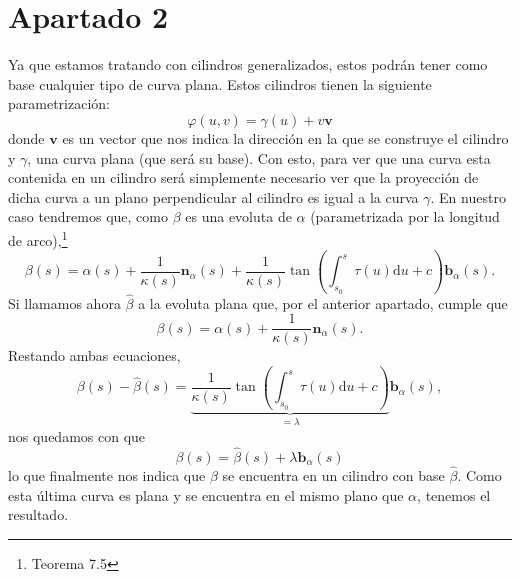 \section{Apartado 2}
Ya que estamos tratando con cilindros generalizados, estos podrán tener como
base cualquier tipo de curva plana. Estos cilindros tienen la siguiente
parametrización:
\[
\varphi \left( u, v \right) = \gamma\left( u \right) + v \mathbf{v}
\]
donde $\mathbf{v}$ es un vector que nos indica la dirección en la que se
construye el cilindro y $\gamma$, una curva plana (que será su base). Con esto, para
ver que una curva esta contenida en un cilindro será simplemente necesario ver
que la proyección de dicha curva a un plano perpendicular al cilindro es igual a
la curva $\gamma$. En nuestro caso tendremos que, como $\beta$ es una evoluta de
$\alpha$ (parametrizada por la longitud de arco),\footnote{Teorema
7.5\cite{sanjurjo}}
\[
\beta\left( s \right) = \alpha\left( s \right) + \frac{1}{\kappa\left( s
\right)}\mathbf{n}_{\alpha}\left( s \right) + \frac{1}{\kappa\left( s \right)}
\tan\left( \int_{s_0}^{s} \tau\left( u \right) \mathrm{d}u + c \right)
\mathbf{b}_{\alpha}\left( s \right).
\]
Si llamamos ahora $\hat{\beta}$ a la evoluta plana que, por el anterior
apartado, cumple que
\[
\beta\left( s \right) = \alpha\left( s \right) + \frac{1}{\kappa\left( s
\right)} \mathbf{n}_{\alpha}\left( s \right).
\]
Restando ambas ecuaciones,
\[
\beta\left( s \right) - \hat{\beta}\left( s \right) =
\underbrace{\frac{1}{\kappa\left( s \right)} \tan\left( \int_{s_0}^{s}
\tau\left( u \right) \mathrm{d}u + c \right)}_{= \lambda}
\mathbf{b}_{\alpha}\left( s \right),
\]
nos quedamos con que
\[
\beta\left( s \right) = \hat{\beta}\left( s \right) + \lambda
\mathbf{b}_{\alpha}\left( s \right)
\]
lo que finalmente nos indica que $\beta$ se encuentra en un cilindro con base
$\hat{\beta}$. Como esta última curva es plana y se encuentra en el mismo plano
que $\alpha$, tenemos el resultado.
